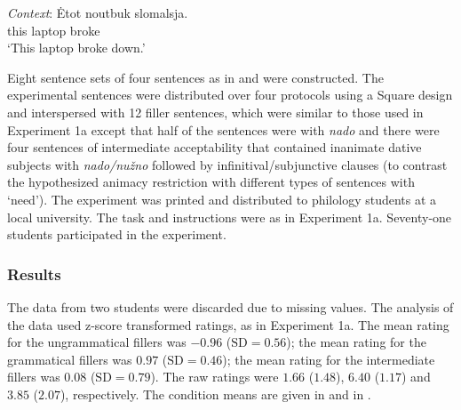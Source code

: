 \documentclass[output=paper]{langscibook}
\begin{document}
\ea \label{materials-exp1b-inan} \gll \textit{Context}: Ėtot noutbuk slomalsja.\\
{} this laptop broke\\
\glt \hspace{1.3cm} `This laptop broke down.' \\
\z\z

\noindent Eight sentence sets of four sentences as in  and  were constructed. The experimental sentences were distributed over four protocols using a  Square design and interspersed with 12 filler sentences, which were similar to those used in Experiment 1a except that half of the sentences were with \textit{nado} and there were four sentences of intermediate acceptability that contained inanimate dative subjects with \textit{nado/nužno} followed by infinitival/subjunctive clauses (to contrast the hypothesized animacy restriction with different types of sentences with `need'). The experiment was printed and distributed to philology students at a local university. The task and instructions were as in Experiment 1a. Seventy-one students participated in the experiment.

\subsubsection{Results}

The data from two students were discarded due to missing values. The analysis of the data used z-score transformed ratings, as in Experiment 1a. The mean rating for the ungrammatical fillers was $-0.96$ ($\text{SD} =0.56$); the mean rating for the grammatical fillers was $0.97$ ($\text{SD} =0.46$); the mean rating for the intermediate fillers was $0.08$ ($\text{SD} =0.79$). The raw ratings were $1.66$ ($1.48$),  $6.40$ ($1.17$) and $3.85$ ($2.07$), respectively. The condition means are given in  and in .
\end{document}
